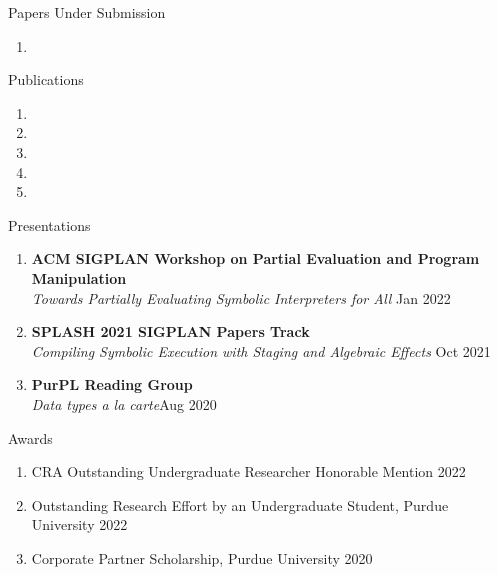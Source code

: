 \documentclass{resume} %
\begin{document}
\begin{rSection}{Papers Under Submission}
    \begin{enumerate}
        \item {}
    \end{enumerate}
\end{rSection}

\begin{rSection}{Publications}
\begin{enumerate}
    \item {}
    \item {}
    \item {}
    \item {}
    \item {}
\end{enumerate}

        

\end{rSection}

\begin{rSection}{Presentations}
\begin{enumerate}
\item \textbf{ACM SIGPLAN Workshop on Partial Evaluation and Program Manipulation}\\
\textit{Towards Partially Evaluating Symbolic Interpreters for All} \hfill Jan 2022
\item \textbf{SPLASH 2021 SIGPLAN Papers Track}\\
\textit{Compiling Symbolic Execution with Staging and Algebraic Effects} \hfill Oct 2021
\item \textbf{PurPL Reading Group} \\
\textit{Data types a la carte}\hfill Aug 2020
\end{enumerate}
\end{rSection}

\begin{rSection}{Awards}
\begin{enumerate}
    \itemsep-0.2cm
    \item CRA Outstanding Undergraduate Researcher Honorable Mention \hfill 2022
    \item Outstanding Research Effort by an Undergraduate Student, Purdue University \hfill 2022
    \item Corporate Partner Scholarship, Purdue University \hfill 2020 
\end{enumerate}
\end{rSection}
\end{document}
